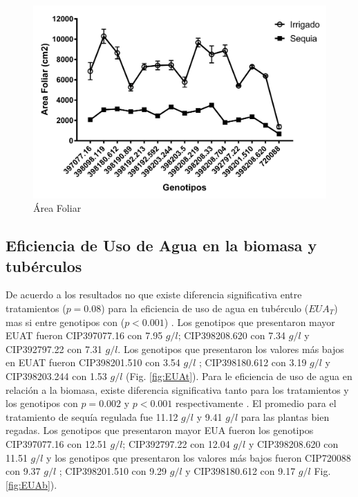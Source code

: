 \documentclass[fleqn,10pt]{Flavio}\usepackage[]{graphicx}\usepackage[]{color}
\begin{document}
\begin{figure}[ht]\centering
\includegraphics[width=\linewidth]{AF}
\caption{\'Area Foliar}
\label{fig:AF}
\end{figure}

\subsection{Eficiencia de Uso de Agua en la biomasa y tub\'erculos} 	

De acuerdo a los resultados no que existe diferencia significativa entre tratamientos ($p = 0.08$) para la eficiencia de uso de agua en tub\'erculo ($EUA_T$) mas si entre genotipos con ($p < 0.001$) \citep{Anyia2004} . Los genotipos que presentaron mayor EUAT fueron CIP397077.16 con  7.95 $g/l$; CIP398208.620  con  7.34 $g/l$ y CIP392797.22 con  7.31 $g/l$. Los genotipos que presentaron los valores m\'as bajos en EUAT fueron CIP398201.510 con 3.54 $g/l$ ; CIP398180.612 con 3.19 $g/l$ y CIP398203.244 con 1.53 $g/l$ (Fig. \ref{fig:EUAt}). Para le eficiencia de uso de agua en relaci\'on a la biomasa, existe diferencia significativa tanto para los tratamientos y los genotipos con $p = 0.002$ y $p < 0.001$ respectivamente . El promedio para el tratamiento de sequ\'ia regulada fue 11.12 $g/l$ y 9.41 $g/l$ para las plantas bien regadas. Los genotipos que presentaron mayor EUA fueron los genotipos CIP397077.16 con  12.51 $g/l$; CIP392797.22 con 12.04 $g/l$ y CIP398208.620 con 11.51 $g/l$ y los genotipos que presentaron los valores m\'as bajos fueron CIP720088 con   9.37 $g/l$ ; CIP398201.510 con 9.29 $g/l$ y CIP398180.612 con 9.17 $g/l$ Fig. \ref{fig:EUAb}).
\end{document}
